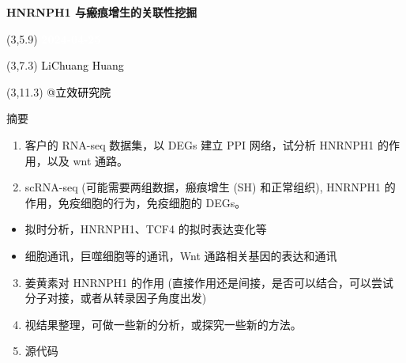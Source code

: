 \documentclass[
  ignorenonframetext,
]{beamer}
\author{}
\date{\vspace{-2.5em}}
\providecommand{\tightlist}{%
  \setlength{\itemsep}{0pt}\setlength{\parskip}{0pt}}
\begin{document}
\begin{frame}
\begin{titlepage} 
\begin{center} \textbf{\Huge HNRNPH1
与瘢痕增生的关联性挖掘} \vspace{4em}
\begin{textblock}{10}(3,5.9) \huge
\textbf{\textcolor{white}{2024-04-25}}
\end{textblock} \begin{textblock}{10}(3,7.3)
\Large \textcolor{black}{LiChuang Huang}
\end{textblock} \begin{textblock}{10}(3,11.3)
\Large \textcolor{black}{@立效研究院}
\end{textblock} \end{center} \end{titlepage}
\restoregeometry


\tableofcontents

\listoffigures

\listoftables



\end{frame}

\begin{frame}{摘要}
\protect\hypertarget{abstract}{}
\begin{enumerate}
\tightlist
\item
  客户的 RNA-seq 数据集，以 DEGs 建立 PPI 网络，试分析 HNRNPH1
  的作用，以及 wnt 通路。
\item
  scRNA-seq (可能需要两组数据，瘢痕增生 (SH) 和正常组织), HNRNPH1
  的作用，免疫细胞的行为，免疫细胞的 DEGs。
\end{enumerate}

\begin{itemize}
\tightlist
\item
  拟时分析，HNRNPH1、TCF4 的拟时表达变化等
\item
  细胞通讯，巨噬细胞等的通讯，Wnt 通路相关基因的表达和通讯
\end{itemize}

\begin{enumerate}
\setcounter{enumi}{2}
\tightlist
\item
  姜黄素对 HNRNPH1 的作用
  (直接作用还是间接，是否可以结合，可以尝试分子对接，或者从转录因子角度出发)
\item
  视结果整理，可做一些新的分析，或探究一些新的方法。
\item
  源代码
\end{enumerate}
\end{frame}
\end{document}
